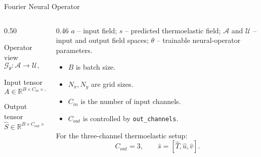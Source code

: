 \documentclass[aspectratio=169,10pt]{beamer}
\begin{document}
\begin{frame}{Fourier Neural Operator}
  \begin{columns}
    \begin{column}{0.50\textwidth}
      \begin{block}{Operator view}
        \[
          \mathcal{G}_{\theta}:\mathcal{A}\rightarrow\mathcal{U},
          \qquad
          \hat{s}=\mathcal{G}_{\theta}(a)
        \]
      \end{block}
      \begin{block}{Input tensor}
        \[
          A\in\mathbb{R}^{B\times C_{in}\times N_x\times N_y}
        \]
      \end{block}
      \begin{block}{Output tensor}
        \[
          \hat{S}\in\mathbb{R}^{B\times C_{out}\times N_x\times N_y}
        \]
      \end{block}
    \end{column}
    \begin{column}{0.46\textwidth}
      \scriptsize
      $a$ -- input field; $\hat{s}$ -- predicted thermoelastic field;
      $\mathcal{A}$ and $\mathcal{U}$ -- input and output field spaces;
      $\theta$ -- trainable neural-operator parameters.
      \footnotesize
      \begin{itemize}
        \item $B$ is batch size.
        \item $N_x,N_y$ are grid sizes.
        \item $C_{in}$ is the number of input channels.
        \item $C_{out}$ is controlled by \texttt{out\_channels}.
      \end{itemize}
      \vskip 4pt
      For the three-channel thermoelastic setup:
      \[
        C_{out}=3,\qquad \hat{s}=[\hat{T},\hat{u},\hat{v}].
      \]
    \end{column}
  \end{columns}
\end{frame}
\end{document}
